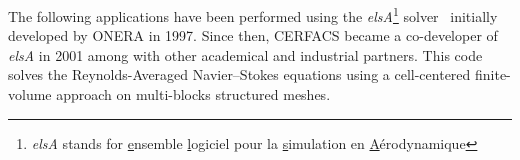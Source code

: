 
The following applications have been performed using the
\emph{elsA}\footnote{\emph{elsA} stands for \underline{e}nsemble 
\underline{l}ogiciel pour la \underline{s}imulation en 
\underline{A}\'erodynamique} solver~\cite{Cambier2013} initially developed by ONERA in 1997.
Since then, CERFACS became a co-developer of \emph{elsA} in 2001 among with other academical
and industrial partners.
This code solves the Reynolds-Averaged Navier--Stokes equations 
using a cell-centered finite-volume approach on multi-blocks structured meshes.

